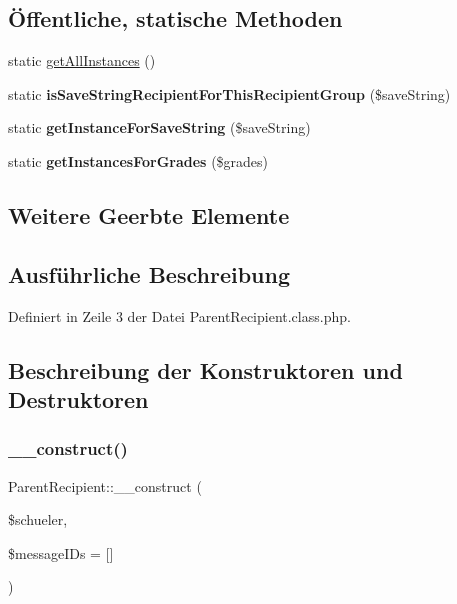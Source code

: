 \subsection*{Öffentliche, statische Methoden}
\begin{DoxyCompactItemize}
\item 
static \mbox{\hyperlink{class_parent_recipient_a92d0bbe902b987627dde3ef7601168dd}{get\+All\+Instances}} ()
\item 
\mbox{\label{class_parent_recipient_aa2627cfa1e33b5c67ca96c72f7993c09}} 
static {\bfseries is\+Save\+String\+Recipient\+For\+This\+Recipient\+Group} (\$save\+String)
\item 
\mbox{\label{class_parent_recipient_a361bef452dd632203be7aacb6f508221}} 
static {\bfseries get\+Instance\+For\+Save\+String} (\$save\+String)
\item 
\mbox{\label{class_parent_recipient_ab036c067b62619ee4802783515a784c6}} 
static {\bfseries get\+Instances\+For\+Grades} (\$grades)
\end{DoxyCompactItemize}
\subsection*{Weitere Geerbte Elemente}


\subsection{Ausführliche Beschreibung}


Definiert in Zeile 3 der Datei Parent\+Recipient.\+class.\+php.



\subsection{Beschreibung der Konstruktoren und Destruktoren}
\mbox{\label{class_parent_recipient_a4169f572dad9ae937e9d4a2bfed16783}} 
\subsubsection{\texorpdfstring{\+\_\+\+\_\+construct()}{\_\_construct()}}
{\footnotesize\ttfamily Parent\+Recipient\+::\+\_\+\+\_\+construct (\begin{DoxyParamCaption}\item[{}]{\$schueler,  }\item[{}]{\$message\+I\+Ds = {\ttfamily \mbox{[}\mbox{]}} }\end{DoxyParamCaption})}


